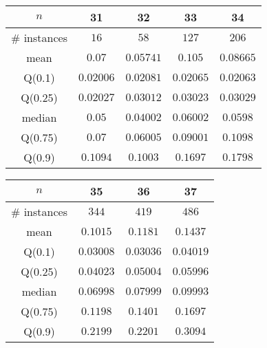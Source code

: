 \begin{tabular}{c|cccc} 
\hline 
$n$ & 31 & 32 & 33 & 34 \tabularnewline 
\hline 
\hline 
\# instances & $16$ & $58$ & $127$ & $206$ \tabularnewline 
mean & $0.07$ & $0.05741$ & $0.105$ & $0.08665$ \tabularnewline 
Q(0.1) & $0.02006$ & $0.02081$ & $0.02065$ & $0.02063$ \tabularnewline 
Q(0.25) & $0.02027$ & $0.03012$ & $0.03023$ & $0.03029$ \tabularnewline 
median & $0.05$ & $0.04002$ & $0.06002$ & $0.0598$ \tabularnewline 
Q(0.75) & $0.07$ & $0.06005$ & $0.09001$ & $0.1098$ \tabularnewline 
Q(0.9) & $0.1094$ & $0.1003$ & $0.1697$ & $0.1798$ \tabularnewline 
\hline 
\end{tabular} 
\medskip{} 

\begin{tabular}{c|ccc} 
\hline 
$n$ & 35 & 36 & 37 \tabularnewline 
\hline 
\hline 
\# instances & $344$ & $419$ & $486$ \tabularnewline 
mean & $0.1015$ & $0.1181$ & $0.1437$ \tabularnewline 
Q(0.1) & $0.03008$ & $0.03036$ & $0.04019$ \tabularnewline 
Q(0.25) & $0.04023$ & $0.05004$ & $0.05996$ \tabularnewline 
median & $0.06998$ & $0.07999$ & $0.09993$ \tabularnewline 
Q(0.75) & $0.1198$ & $0.1401$ & $0.1697$ \tabularnewline 
Q(0.9) & $0.2199$ & $0.2201$ & $0.3094$ \tabularnewline 
\hline 
\end{tabular} 
\medskip{} 

